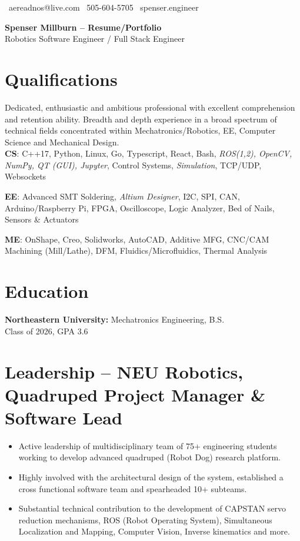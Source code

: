 \documentclass[11pt,a4paper]{article}
\newcommand{\header}[2]{
  \begin{center}
    \huge \textbf{#1}\\
    \large #2
  \end{center}
}
\newcommand{\qualificationarea}[2]{
  \textbf{#1}: #2
}
\begin{document}
\begin{center}
  \small \faEnvelope\ aereadnos@live.com \hspace{1em} \faPhone\ 505-604-5705 \hspace{1em} \faGlobe\ spenser.engineer
\end{center}
\header{Spenser Millburn -- Resume/Portfolio}{Robotics Software Engineer / Full Stack Engineer}

\section*{Qualifications}
Dedicated, enthusiastic and ambitious professional with excellent comprehension and retention ability. Breadth and depth experience in a broad spectrum of technical fields concentrated within Mechatronics/Robotics, EE, Computer Science and Mechanical Design.\\

\qualificationarea{CS}{C++17, Python, Linux, Go, Typescript, React, Bash, \textit{ROS(1,2), OpenCV,  NumPy, QT (GUI), Jupyter}, Control Systems, \textit{Simulation}, TCP/UDP, Websockets}

\qualificationarea{EE}{Advanced SMT Soldering, \textit{Altium Designer}, I2C, SPI, CAN, Arduino/Raspberry Pi, FPGA, Oscilloscope, Logic Analyzer, Bed of Nails, Sensors \& Actuators}

\qualificationarea{ME}{OnShape, Creo, Solidworks, AutoCAD, Additive MFG, CNC/CAM Machining (Mill/Lathe), DFM, Fluidics/Microfluidics, Thermal Analysis}

\section*{Education}
\textbf{Northeastern University:} Mechatronics Engineering, B.S.\\
Class of 2026, GPA 3.6


\section*{Leadership -- NEU Robotics, Quadruped Project Manager \& Software Lead}
\begin{itemize}
\item Active leadership of multidisciplinary team of 75+ engineering students working to develop advanced quadruped (Robot Dog) research platform.
\item Highly involved with the architectural design of the system, established a cross functional software team and spearheaded 10+ subteams.
\item Substantial technical contribution to the development of CAPSTAN servo reduction mechanisms, ROS (Robot Operating System), Simultaneous Localization and Mapping, Computer Vision, Inverse kinematics and more.
\end{itemize}
\end{document}
